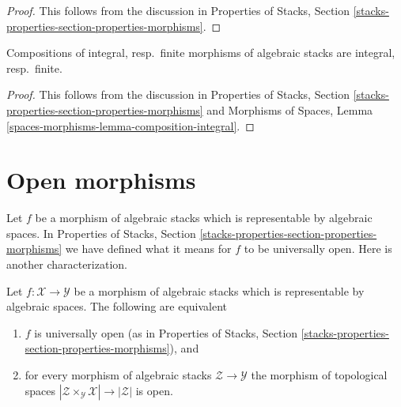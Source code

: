 \begin{proof}
This follows from the discussion in
Properties of Stacks, Section
\ref{stacks-properties-section-properties-morphisms}.
\end{proof}

\begin{lemma}
\label{lemma-composition-integral}
Compositions of integral, resp.\ finite morphisms of algebraic stacks
are integral, resp.\ finite.
\end{lemma}

\begin{proof}
This follows from the discussion in
Properties of Stacks, Section
\ref{stacks-properties-section-properties-morphisms}
and
Morphisms of Spaces, Lemma \ref{spaces-morphisms-lemma-composition-integral}.
\end{proof}




\section{Open morphisms}
\label{section-open}

\noindent
Let $f$ be a morphism of algebraic stacks which is representable by
algebraic spaces. In
Properties of Stacks, Section
\ref{stacks-properties-section-properties-morphisms}
we have defined what it means for $f$ to be universally open.
Here is another characterization.

\begin{lemma}
\label{lemma-characterize-representable-universally-open}
Let $f : \mathcal{X} \to \mathcal{Y}$ be a morphism of
algebraic stacks which is representable by algebraic spaces.
The following are equivalent
\begin{enumerate}
\item $f$ is universally open (as in Properties of Stacks,
Section \ref{stacks-properties-section-properties-morphisms}), and
\item for every morphism of algebraic stacks $\mathcal{Z} \to \mathcal{Y}$
the morphism of topological spaces
$|\mathcal{Z} \times_\mathcal{Y} \mathcal{X}| \to |\mathcal{Z}|$ is open.
\end{enumerate}
\end{lemma}

